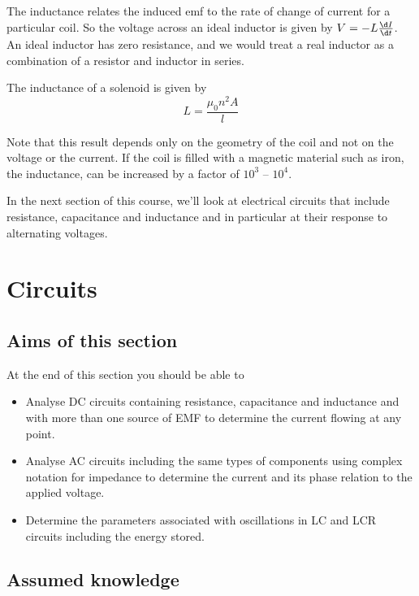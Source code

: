 \documentclass[
]{book}
\theoremstyle{definition}
\theoremstyle{definition}
\theoremstyle{definition}
\theoremstyle{definition}
\theoremstyle{remark}
\begin{document}
The inductance relates the induced emf to the rate of change of current
for a particular coil. So the voltage across an ideal inductor is given
by \(V = -L \frac{\d I}{\d t}\). An ideal inductor has zero resistance,
and we would treat a real inductor as a combination of a resistor and
inductor in series.

The inductance of a solenoid is given by \[L = \frac{\mu_0 n^2 A}{l}\]

Note that this result depends only on the geometry of the coil and not
on the voltage or the current. If the coil is filled with a magnetic
material such as iron, the inductance, can be increased by a factor of
\(10^3\) -- \(10^4\).

In the next section of this course, we'll look at electrical circuits
that include resistance, capacitance and inductance and in particular at
their response to alternating voltages.

\hypertarget{circuits}{%
\chapter{Circuits}\label{circuits}}

\hypertarget{aims-of-this-section-1}{%
\section*{Aims of this section}\label{aims-of-this-section-1}}

At the end of this section you should be able to

\begin{itemize}
\item
  Analyse DC circuits containing resistance, capacitance and
  inductance and with more than one source of EMF to determine the
  current flowing at any point.
\item
  Analyse AC circuits including the same types of components using
  complex notation for impedance to determine the current and its
  phase relation to the applied voltage.
\item
  Determine the parameters associated with oscillations in LC and LCR
  circuits including the energy stored.
\end{itemize}

\hypertarget{assumed-knowledge}{%
\section*{Assumed knowledge}\label{assumed-knowledge}}
\end{document}
